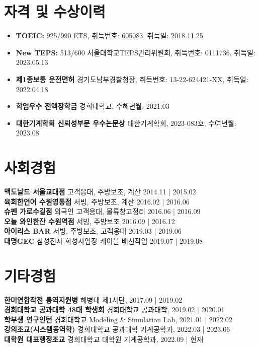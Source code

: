 \documentclass[a4paper,10pt]{extarticle}
\begin{document}
\section*{자격 및 수상이력}
\begin{itemize}
    \item \textbf{TOEIC:} 925/990 \hfill ETS, 취득번호: 605083, 취득일: 2018.11.25
    \item \textbf{New TEPS:} 513/600 \hfill 서울대학교TEPS관리위원회, 취득번호: 0111736, 취득일: 2023.05.13
    \item \textbf{제1종보통 운전면허} \hfill 경기도남부경찰청장, 취득번호: 13-22-624421-XX, 취득일: 2022.04.18
    \item \textbf{학업우수 전액장학금} \hfill 경희대학교, 수혜년월: 2021.03
    \item \textbf{대한기계학회 신뢰성부문 우수논문상} \hfill 대한기계학회, 2023-083호, 수여년월: 2023.08
\end{itemize}

\section*{사회경험}
\noindent
\textbf{맥도날드 서울교대점} 고객응대, 주방보조, 계산 \hfill 2014.11 | 2015.02\\
\textbf{육회한연어 수원영통점} 서빙, 주방보조, 계산 \hfill 2016.02 | 2016.06\\
\textbf{슈펜 가로수길점} 외국인 고객응대, 물류창고정리 \hfill 2016.06 | 2016.09\\
\textbf{오늘 와인한잔 수원역점} 서빙, 주방보조 \hfill 2016.09 | 2016.12\\
\textbf{아이리스 BAR} 서빙, 주방보조, 고객응대 \hfill 2019.03 | 2019.06\\
\textbf{대명GEC} 삼성전자 화성사업장 케이블 배선작업 \hfill 2019.07 | 2019.08\\

\section*{기타경험}
\textbf{한미연합작전 통역지원병} \hfill 해병대 제1사단, 2017.09 | 2019.02\\
\textbf{경희대학교 공과대학 48대 학생회} \hfill 경희대학교 공과대학, 2019.02 | 2020.01\\
\textbf{학부생 연구인턴} \hfill 경희대학교 Modeling \& Simulation Lab, 2021.01 | 2022.02\\
\textbf{강의조교(시스템동역학)} \hfill 경희대학교 공과대학 기계공학과, 2022.03 | 2023.06\\
\textbf{대학원 대표행정조교} \hfill 경희대학교 대학원 기계공학과, 2022.09 | 현재\\

\end{document}
